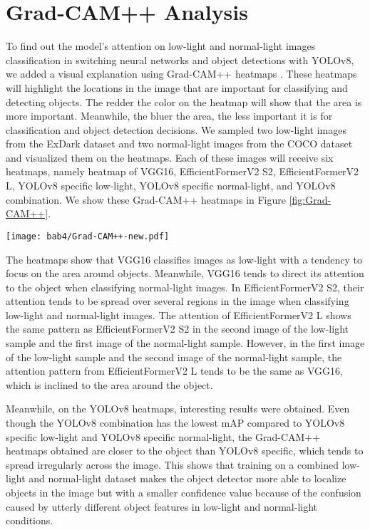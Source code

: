 \section{Grad-CAM++ Analysis}

To find out the model's attention on low-light and normal-light images classification in switching neural networks and object detections with YOLOv8, we added a visual explanation using Grad-CAM++ heatmaps \cite{Chattopadhay_2018}. These heatmaps will highlight the locations in the image that are important for classifying and detecting objects. The redder the color on the heatmap will show that the area is more important. Meanwhile, the bluer the area, the less important it is for classification and object detection decisions. We sampled two low-light images from the ExDark dataset and two normal-light images from the COCO dataset and visualized them on the heatmaps. Each of these images will receive six heatmaps, namely heatmap of VGG16, EfficientFormerV2 S2, EfficientFormerV2 L, YOLOv8 specific low-light, YOLOv8 specific normal-light, and YOLOv8 combination. We show these Grad-CAM++ heatmaps in Figure \ref{fig:Grad-CAM++}. 

\begin{figure*}[h]
	\centering
	\texttt{[image: bab4/Grad-CAM++-new.pdf]}
	\caption{Grad-CAM++ Heatmaps of the Switching Neural Network Models and Object Detectors \label{fig:Grad-CAM++}}
\end{figure*}

The heatmaps show that VGG16 classifies images as low-light with a tendency to focus on the area around objects. Meanwhile, VGG16 tends to direct its attention to the object when classifying normal-light images. In EfficientFormerV2 S2, their attention tends to be spread over several regions in the image when classifying low-light and normal-light images. The attention of EfficientFormerV2 L shows the same pattern as EfficientFormerV2 S2 in the second image of the low-light sample and the first image of the normal-light sample. However, in the first image of the low-light sample and the second image of the normal-light sample, the attention pattern from EfficientFormerV2 L tends to be the same as VGG16, which is inclined to the area around the object.

Meanwhile, on the YOLOv8 heatmaps, interesting results were obtained. Even though the YOLOv8 combination has the lowest mAP compared to YOLOv8 specific low-light and YOLOv8 specific normal-light, the Grad-CAM++ heatmaps obtained are closer to the object than YOLOv8 specific, which tends to spread irregularly across the image. This shows that training on a combined low-light and normal-light dataset makes the object detector more able to localize objects in the image but with a smaller confidence value because of the confusion caused by utterly different object features in low-light and normal-light conditions.                                                            
                                                            




